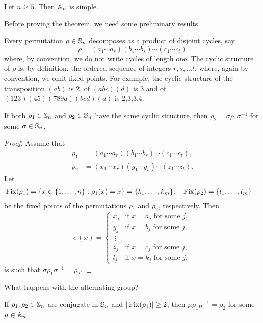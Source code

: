 \begin{theorem}[Jordan]
\label{thm:Jordan}
    Let $n\geq5$. Then $\mathbb{A}_n$ is simple. 
\end{theorem}

Before proving the theorem, we need some preliminary results.

Every permutation $\rho\in\mathbb{S}_n$ decomposes as a product of disjoint cycles, say
\[
\rho=(a_1\cdots a_r)(b_1\cdots b_s)\cdots (c_1\cdots c_t)
\]
where, by convention, we do not write cycles of length one. 
The cyclic structure of $\rho$ is, by definition, the ordered 
sequence of integers $r,s,\dots t$, where, again by convention,  
we omit fixed points. For example, the cyclic structure of 
the transposition $(ab)$ is 2, 
of $(abc)(d)$ is 3 and of $(123)(45)(789a)(bcd)(d)$ is 2,3,3,4. 

\begin{lemma}
If both $\rho_1\in\mathbb{S}_n$ and $\rho_2\in\mathbb{S}_n$ have the same
cyclic structure, then 
$\rho_2=\sigma\rho_1\sigma^{-1}$ for some
$\sigma\in\mathbb{S}_n$. 
\end{lemma}

\begin{proof}
Assume that 
\begin{align*}
\rho_1&=(a_1\cdots a_r)(b_1\cdots b_s)\cdots (c_1\cdots c_t),\\
\rho_2&=(x_1\cdots x_r)(y_1\cdots y_s)\cdots (z_1\cdots z_t).
\end{align*}
Let  
\begin{align*}
\operatorname{Fix}(\rho_1) &= \{x\in\{1,\dots,n\}:\rho_1(x)=x\}=\{k_1,\dots,k_m\},&&
\operatorname{Fix}(\rho_2)=\{l_1,\dots,l_m\}	
\end{align*}
be the fixed points of the permutations $\rho_1$ and $\rho_2$,
respectively. Then 
\[
\sigma(x)=\begin{cases}
x_j & \text{if $x=a_j$ for some $j$},\\
y_j & \text{if $x=b_j$ for some $j$},\\
\;\vdots\\
z_j & \text{if $x=c_j$ for some $j$},\\
l_j & \text{if $x=k_j$ for some $j$},	
\end{cases}
\]
is such that $\sigma\rho_1\sigma^{-1}=\rho_2$. 
\end{proof}

What happens with the alternating group? 

\begin{lemma}
If $\rho_1,\rho_2\in\mathbb{S}_n$ are conjugate in $\mathbb{S}_n$ and  $|\operatorname{Fix}(\rho_1)|\geq2$, then 
$\mu\rho_1\mu^{-1}=\rho_2$ for some $\mu\in\mathbb{A}_n$.  
\end{lemma}

